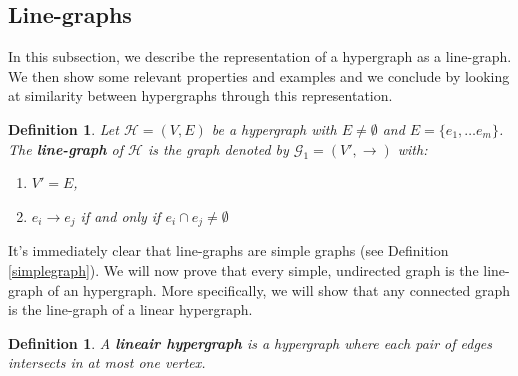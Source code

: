 \documentclass[a4paper,11pt]{report}
\newtheorem{definition}[theorem]{Definition}
\newcommand{\graf}{\mathscr{G}}
\newcommand{\hgrafeen}{\mathcal{H}}
\begin{document}
\subsection{Line-graphs}
In this subsection, we describe the representation of a hypergraph as a 
line-graph. We then show some relevant properties and examples and we conclude 
by looking at similarity between hypergraphs through this representation.
\begin{definition}
  Let $\hgrafeen = (V,E)$ be a hypergraph with $E \not = \emptyset$ and $E = \{e_1, \ldots e_m\}$. The \textbf{line-graph} of $\hgrafeen$ is the graph 
  denoted by $\graf_1 = (V', \to)$ 
with:
  \begin{enumerate}
    \item $V' = E$,
    \item $e_i \to e_j$ if and only if $e_i \cap e_j \not = \emptyset$
  \end{enumerate}
\end{definition}
It's immediately clear that line-graphs are simple graphs (see Definition \ref{simplegraph}). We will 
now prove that every simple, undirected graph is the line-graph of an hypergraph. More 
specifically, we will show that any connected graph is the line-graph of a linear 
hypergraph.

\begin{definition}
  A \textbf{lineair hypergraph} is a hypergraph where each pair of edges
  intersects in at most one vertex.
  \end{definition}
  
\end{document}
